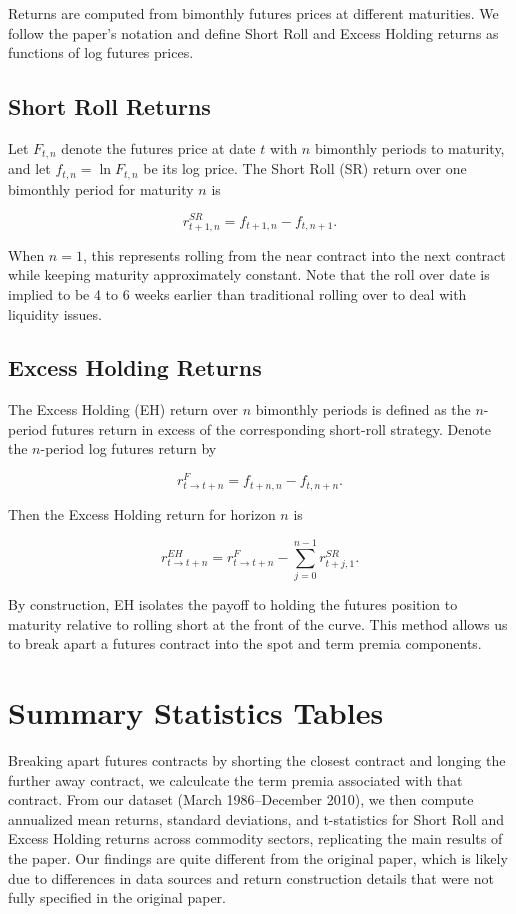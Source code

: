 \documentclass[11pt]{article}
\begin{document}
Returns are computed from bimonthly futures prices at different
maturities. We follow the paper’s notation and define Short Roll and
Excess Holding returns as functions of log futures prices.

\subsection{Short Roll Returns}

Let \(F_{t,n}\) denote the futures price at date \(t\) with \(n\)
bimonthly periods to maturity, and let \(f_{t,n} = \ln F_{t,n}\) be its
log price. The Short Roll (SR) return over one bimonthly period for
maturity \(n\) is

\[
r^{SR}_{t+1,n}
  = f_{t+1,n} - f_{t,n+1}.
\]

When \(n=1\), this represents rolling from the near contract into the
next contract while keeping maturity approximately constant. Note that the roll over date is implied to be 4 to 6 weeks earlier than traditional rolling over to deal with liquidity issues.

\subsection{Excess Holding Returns}

The Excess Holding (EH) return over \(n\) bimonthly periods is defined
as the \(n\)-period futures return in excess of the corresponding
short-roll strategy. Denote the \(n\)-period log futures return by

\[
r^{F}_{t \rightarrow t+n}
  = f_{t+n,n} - f_{t,n+n}.
\]

Then the Excess Holding return for horizon \(n\) is

\[
r^{EH}_{t \rightarrow t+n}
  = r^{F}_{t \rightarrow t+n}
    - \sum_{j=0}^{n-1} r^{SR}_{t+j,1}.
\]

By construction, EH isolates the payoff to holding the futures position
to maturity relative to rolling short at the front of the curve. This method allows us to break apart a futures contract into the spot and term premia components.

\section{Summary Statistics Tables}

Breaking apart futures contracts by shorting the closest contract and longing the further away contract, we calculcate the term premia associated with that contract. From our dataset (March 1986--December 2010), we then compute annualized mean returns, standard deviations, and t-statistics for Short Roll and Excess Holding returns across commodity sectors, replicating the main results of the paper.
Our findings are quite different from the original paper, which is likely due to differences in data sources and return construction details that were not fully specified in the original paper.
\end{document}
